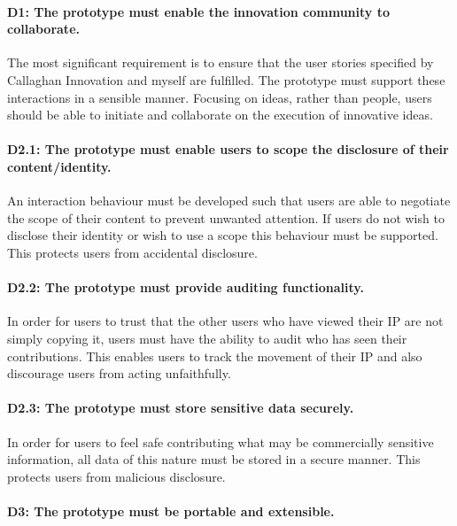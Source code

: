 \paragraph{D1: The prototype must enable the innovation community to collaborate.}

The most significant requirement is to ensure that the user stories specified by Callaghan Innovation and myself are fulfilled. The prototype must support these interactions in a sensible manner. Focusing on ideas, rather than people, users should be able to initiate and collaborate on the execution of innovative ideas.

\paragraph{D2.1:  The prototype must enable users to scope the disclosure of their content/identity.}

An interaction behaviour must be developed such that users are able to negotiate the scope of their content to prevent unwanted attention. If users do not wish to disclose their identity or wish to use a scope this behaviour must be supported. This protects users from accidental disclosure.

\paragraph{D2.2: The prototype must provide auditing functionality.}

In order for users to trust that the other users who have viewed their IP are not simply copying it, users must have the ability to audit who has seen their contributions. This enables users to track the movement of their IP and also discourage users from acting unfaithfully.

\paragraph{D2.3: The prototype must store sensitive data securely.}

In order for users to feel safe contributing what may be commercially sensitive information, all data of this nature must be stored in a secure manner. This protects users from malicious disclosure.

\paragraph{D3:  The prototype must be portable and extensible.}

